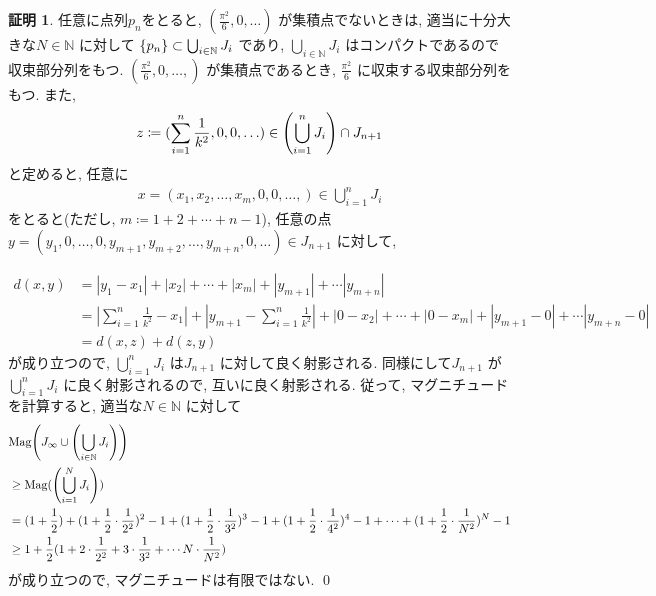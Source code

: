 \documentclass[10pt, fleqn, label-section=none]{bxjsarticle}
\theoremstyle{definition}
\newtheorem*{pf*}{証明}
\newcommand{\paren}[1]{\mleft( #1\mright )}
\newcommand{\cbra}[1]{\mleft\{#1\mright\}}
\newcommand{\abs}[1]{\left|#1\right|}
\renewcommand{\;}{\, ; \,}
\newcommand{\Mag}{\textrm{Mag}}
\begin{document}
\begin{pf*}任意に点列$p_n$をとると, $(\frac{\pi^2}{6}, 0, \ldots )$ が集積点でないときは, 適当に十分大きな$N \in \mathbb N$ に対して $\cbra{p_n}\subset  \bigcup_{i \in \mathbb N} J_i$ であり, $\bigcup_{i \in \mathbb N} J_i$ はコンパクトであるので収束部分列をもつ. $(\frac{\pi^2}{6}, 0, \ldots, )$ が集積点であるとき, $\frac{\pi^2}{6}$ に収束する収束部分列をもつ. また, 
\begin{align*} z \coloneqq (\sum_{i= 1}^n \frac{1}{k^2}, 0, 0, \ldots  )  \in \paren{\bigcup_{i = 1}^{n } J_i } \cap J_{n+1} \end{align*}
と定めると, 任意に
\begin{align*}x =  (x_1, x_2, \ldots , x_m, 0, 0, \ldots, ) \in \bigcup_{i = 1}^{n } J_i  \end{align*}
をとると(ただし, $m  \coloneqq 1 + 2 + \cdots + n-1$), 任意の点$y = (y_1, 0, \ldots , 0 , y_{m +1}, y_{m+2}, \ldots, y_{m+n}, 0, \ldots )  \in J_{n + 1}$ に対して, 

\begin{align*} d(x, y) &= \abs{y_1 - x_1} + \abs{x_2} +  \cdots +  \abs{x_m} + \abs{y_{m+1}} + \cdots \abs{y_{m+n}} \\&= \abs{\sum_{i= 1}^n \frac{1}{k^2} - x_1} + \abs{y_{m+1} - \sum_{i= 1}^n \frac{1}{k^2} }  + \abs{0 - x_2} +  \cdots +  \abs{0- x_m} +  \abs{y_{m+1} - 0 } + \cdots \abs{y_{m+n} - 0} 
\\&=  d(x, z) + d(z, y)   \end{align*}
が成り立つので, $\bigcup_{i = 1}^{n } J_i$ は$J_{n+1}$ に対して良く射影される. 同様にして$J_{n+1}$ が$\bigcup_{i = 1}^{n } J_i$ に良く射影されるので, 互いに良く射影される. 従って, マグニチュードを計算すると, 適当な$N \in \mathbb N $ に対して
\begin{align*} &\Mag \paren{J_\infty \cup \paren{\bigcup_{i \in \mathbb N} J_i } } 
\\& \geq \Mag (\paren{\bigcup_{i = 1}^N J_i } )
\\&= (1 + \frac{1}{2}) + (1 + \frac{1}{2}\cdot \frac{1}{2^2} )^2 - 1 + (1 + \frac{1}{2}\cdot \frac{1}{3^2} )^3 - 1 + (1 + \frac{1}{2}\cdot \frac{1}{4^2} )^4 -1 + \cdots +(1 + \frac{1}{2}\cdot \frac{1}{N^2} )^N -1 
\\&\geq 1 + \frac{1}{2} (1 +  2 \cdot \frac{1}{2^2} + 3 \cdot \frac{1}{3^2} + \cdots N \cdot \frac{1}{N^2} )     \end{align*}
が成り立つので, マグニチュードは有限ではない. 
\qed
\end{pf*}
\end{document}
